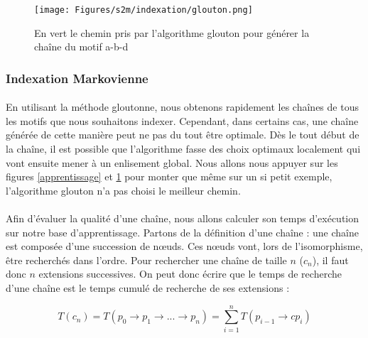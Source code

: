 \documentclass[12pt,french,twoside]{report}
\begin{document}
\begin{figure}[!ht]
  \begin{center}
    \texttt{[image: Figures/s2m/indexation/glouton.png]}
    \caption{\label{glouton}En vert le chemin pris par l'algorithme glouton pour générer la chaîne du motif a-b-d}
  \end{center}
\end{figure}

\subsubsection{Indexation Markovienne}

\label{index_markov}

\paragraph{}En utilisant la méthode gloutonne, nous obtenons rapidement les chaînes de tous les motifs que nous
souhaitons indexer. Cependant, dans certains cas, une chaîne générée de cette manière peut ne pas du tout être optimale.
Dès le tout début de la chaîne, il est possible que l'algorithme fasse des choix optimaux localement qui vont ensuite mener à un
enlisement global. Nous allons nous appuyer sur les figures \ref{apprentissage} et \ref{glouton} pour monter que même sur un si
petit exemple, l'algorithme glouton n'a pas choisi le meilleur chemin.

\paragraph{}Afin d'évaluer la qualité d'une chaîne, nous allons calculer son temps d'exécution sur notre base d'apprentissage.
Partons de la définition d'une chaîne : une chaîne est composée d'une succession de n\oe{}uds. Ces n\oe{}uds vont, lors de l'isomorphisme,
être recherchés dans l'ordre. Pour rechercher une chaîne de taille $n$ ($c_n$), il faut donc $n$ extensions successives. On
peut donc écrire que le temps de recherche d'une chaîne est le temps cumulé de recherche de ses extensions :

\begin{equation}
 T(c_n) = T(p_0 \rightarrow p_1 \rightarrow ... \rightarrow p_n) = \sum_{i=1}^n T(p_{i-1} \rightarrow cp_i)
\end{equation}
\end{document}
